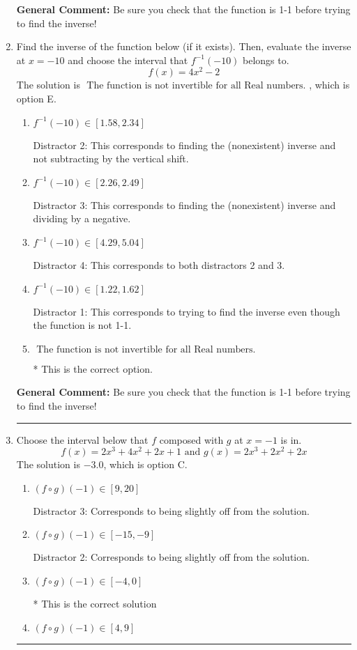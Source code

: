 \documentclass{extbook}[14pt]
\newcommand{\litem}[1]{\item #1

\rule{\textwidth}{0.4pt}}
\begin{document}
\begin{enumerate}
{\textbf{General Comment:} Be sure you check that the function is 1-1 before trying to find the inverse!
}
\litem{
Find the inverse of the function below (if it exists). Then, evaluate the inverse at $x = -10$ and choose the interval that $f^{-1}(-10)$ belongs to.
\[ f(x) = 4 x^2 - 2 \]The solution is \( \text{ The function is not invertible for all Real numbers. } \), which is option E.\begin{enumerate}[label=\Alph*.]
\item \( f^{-1}(-10) \in [1.58, 2.34] \)

 Distractor 2: This corresponds to finding the (nonexistent) inverse and not subtracting by the vertical shift.
\item \( f^{-1}(-10) \in [2.26, 2.49] \)

 Distractor 3: This corresponds to finding the (nonexistent) inverse and dividing by a negative.
\item \( f^{-1}(-10) \in [4.29, 5.04] \)

 Distractor 4: This corresponds to both distractors 2 and 3.
\item \( f^{-1}(-10) \in [1.22, 1.62] \)

 Distractor 1: This corresponds to trying to find the inverse even though the function is not 1-1. 
\item \( \text{ The function is not invertible for all Real numbers. } \)

* This is the correct option.
\end{enumerate}

\textbf{General Comment:} Be sure you check that the function is 1-1 before trying to find the inverse!
}
\litem{
Choose the interval below that $f$ composed with $g$ at $x=-1$ is in.
\[ f(x) = 2x^{3} +4 x^{2} +2 x + 1 \text{ and } g(x) = 2x^{3} +2 x^{2} +2 x \]The solution is \( -3.0 \), which is option C.\begin{enumerate}[label=\Alph*.]
\item \( (f \circ g)(-1) \in [9, 20] \)

 Distractor 3: Corresponds to being slightly off from the solution.
\item \( (f \circ g)(-1) \in [-15, -9] \)

 Distractor 2: Corresponds to being slightly off from the solution.
\item \( (f \circ g)(-1) \in [-4, 0] \)

* This is the correct solution
\item \( (f \circ g)(-1) \in [4, 9] \)


\end{enumerate}}
\end{enumerate}
\end{document}
